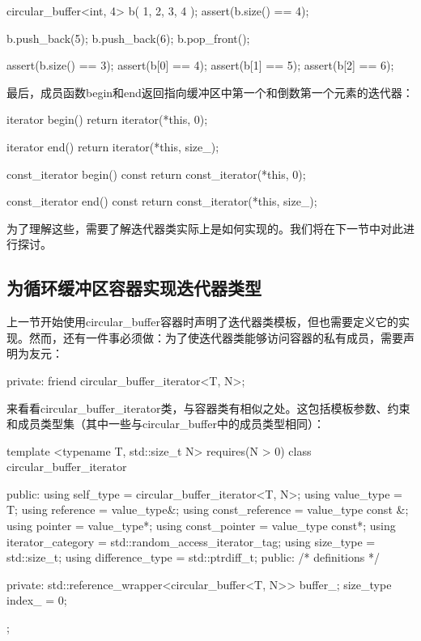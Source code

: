 \begin{cpp}
circular_buffer<int, 4> b({ 1, 2, 3, 4 });
assert(b.size() == 4);

b.push_back(5);
b.push_back(6);
b.pop_front();

assert(b.size() == 3);
assert(b[0] == 4);
assert(b[1] == 5);
assert(b[2] == 6);
\end{cpp}

最后，成员函数begin和end返回指向缓冲区中第一个和倒数第一个元素的迭代器：

\begin{cpp}
iterator begin()
{
	return iterator(*this, 0);
}

iterator end()
{
	return iterator(*this, size_);
}

const_iterator begin() const
{
	return const_iterator(*this, 0);
}

const_iterator end() const
{
	return const_iterator(*this, size_);
}
\end{cpp}

为了理解这些，需要了解迭代器类实际上是如何实现的。我们将在下一节中对此进行探讨。

\subsection{为循环缓冲区容器实现迭代器类型}

上一节开始使用circular\_buffer容器时声明了迭代器类模板，但也需要定义它的实现。然而，还有一件事必须做：为了使迭代器类能够访问容器的私有成员，需要声明为友元：

\begin{cpp}
private:
	friend circular_buffer_iterator<T, N>;
\end{cpp}

来看看circular\_buffer\_iterator类，与容器类有相似之处。这包括模板参数、约束和成员类型集（其中一些与circular\_buffer中的成员类型相同）：

\begin{cpp}
template <typename T, std::size_t N>
requires(N > 0)
class circular_buffer_iterator
{
public:
	using self_type = circular_buffer_iterator<T, N>;
	using value_type = T;
	using reference = value_type&;
	using const_reference = value_type const &;
	using pointer = value_type*;
	using const_pointer = value_type const*;
	using iterator_category =
		std::random_access_iterator_tag;
	using size_type = std::size_t;
	using difference_type = std::ptrdiff_t;
public:
	/* definitions */
	
private:
	std::reference_wrapper<circular_buffer<T, N>> buffer_;
	size_type index_ = 0;
};
\end{cpp}

